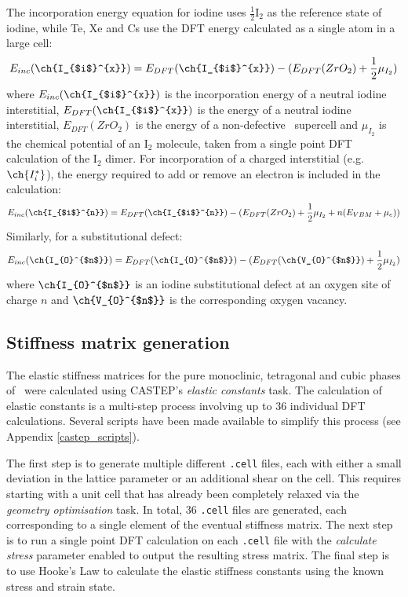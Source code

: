 The incorporation energy equation for iodine uses $\frac{1}{2}$I$_{2}$ as the reference state of iodine, while Te, Xe and Cs use the DFT energy calculated as a single atom in a large cell:
\begin{equation}
\label{interstitial_incorp_equation}
E_{inc}(\ch{I_{$i$}^{x}}) = E_{DFT}(\ch{I_{$i$}^{x}}) - (E_{DFT}(ZrO_2) + \frac{1}{2}\mu_{I_{2}})  %
\end{equation}
where $E_{inc}(\ch{I_{$i$}^{x}})$ is the incorporation energy of a neutral iodine interstitial, $E_{DFT}(\ch{I_{$i$}^{x}})$ is the energy of a neutral iodine interstitial, $E_{DFT}(ZrO_2)$ is the energy of a non-defective \zirconia\ supercell and $\mu_{I_{2}}$ is the chemical potential of an I$_{2}$ molecule, taken from a single point DFT calculation of the I$_{2}$ dimer. For incorporation of a charged interstitial (e.g. $\ch{I_{i}^{*}}$), the energy required to add or remove an electron is included in the calculation:
\begin{equation}
\label{interstitial_incorp_equation_charged}
E_{inc}(\ch{I_{$i$}^{n}}) = E_{DFT}(\ch{I_{$i$}^{n}}) - (E_{DFT}(ZrO_2) + \frac{1}{2}\mu_{I_{2}} + n(E_{VBM} + \mu_{e}))
\end{equation}
Similarly, for a substitutional defect:
\begin{equation}
\label{o_sub_incorp_equation}
E_{inc}(\ch{I_{O}^{$n$}}) = E_{DFT}(\ch{I_{O}^{$n$}}) - (E_{DFT}(\ch{V_{O}^{$n$}}) + \frac{1}{2}\mu_{I_{2}})  %
\end{equation}
where $\ch{I_{O}^{$n$}}$ is an iodine substitutional defect at an oxygen site of charge $n$ and $\ch{V_{O}^{$n$}}$ is the corresponding oxygen vacancy.

\subsection{Stiffness matrix generation}

The elastic stiffness matrices for the pure monoclinic, tetragonal and cubic phases of \zirconia\ were calculated using CASTEP's \emph{elastic constants} task. The calculation of elastic constants is a multi-step process involving up to 36 individual DFT calculations. Several scripts have been made available to simplify this process (see Appendix \ref{castep_scripts}).

The first step is to generate multiple different \texttt{.cell} files, each with either a small deviation in the lattice parameter or an additional shear on the cell. This requires starting with a unit cell that has already been completely relaxed via the \emph{geometry optimisation} task. In total, 36 \texttt{.cell} files are generated, each corresponding to a single element of the eventual stiffness matrix. The next step is to run a single point DFT calculation on each \texttt{.cell} file with the \emph{calculate stress} parameter enabled to output the resulting stress matrix. The final step is to use Hooke's Law to calculate the elastic stiffness constants using the known stress and strain state. 

